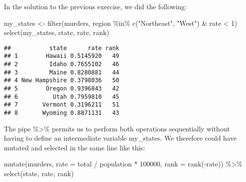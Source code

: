 \documentclass[
]{article}
\newenvironment{Shaded}{\begin{snugshade}}{\end{snugshade}}
\newcommand{\AttributeTok}[1]{\textcolor[rgb]{0.77,0.63,0.00}{#1}}
\newcommand{\DecValTok}[1]{\textcolor[rgb]{0.00,0.00,0.81}{#1}}
\newcommand{\FunctionTok}[1]{\textcolor[rgb]{0.00,0.00,0.00}{#1}}
\newcommand{\NormalTok}[1]{#1}
\newcommand{\OtherTok}[1]{\textcolor[rgb]{0.56,0.35,0.01}{#1}}
\newcommand{\SpecialCharTok}[1]{\textcolor[rgb]{0.00,0.00,0.00}{#1}}
\newcommand{\StringTok}[1]{\textcolor[rgb]{0.31,0.60,0.02}{#1}}
\begin{document}
In the solution to the previous exercise, we did the following:

\begin{Shaded}
\begin{Highlighting}[]
\NormalTok{my\_states }\OtherTok{\textless{}{-}} \FunctionTok{filter}\NormalTok{(murders, region }\SpecialCharTok{\%in\%} \FunctionTok{c}\NormalTok{(}\StringTok{"Northeast"}\NormalTok{, }\StringTok{"West"}\NormalTok{) }\SpecialCharTok{\&}\NormalTok{ rate }\SpecialCharTok{\textless{}} \DecValTok{1}\NormalTok{)}
\FunctionTok{select}\NormalTok{(my\_states, state, rate, rank)}
\end{Highlighting}
\end{Shaded}

\begin{verbatim}
##           state      rate rank
## 1        Hawaii 0.5145920   49
## 2         Idaho 0.7655102   46
## 3         Maine 0.8280881   44
## 4 New Hampshire 0.3798036   50
## 5        Oregon 0.9396843   42
## 6          Utah 0.7959810   45
## 7       Vermont 0.3196211   51
## 8       Wyoming 0.8871131   43
\end{verbatim}

The pipe \%\textgreater\% permits us to perform both operations
sequentially without having to define an intermediate variable
my\_states. We therefore could have mutated and selected in the same
line like this:

\begin{Shaded}
\begin{Highlighting}[]
\FunctionTok{mutate}\NormalTok{(murders, }\AttributeTok{rate =}\NormalTok{  total }\SpecialCharTok{/}\NormalTok{ population }\SpecialCharTok{*} \DecValTok{100000}\NormalTok{, }\AttributeTok{rank =} \FunctionTok{rank}\NormalTok{(}\SpecialCharTok{{-}}\NormalTok{rate)) }\SpecialCharTok{\%\textgreater{}\%} \FunctionTok{select}\NormalTok{(state, rate, rank)}
\end{Highlighting}
\end{Shaded}
\end{document}
